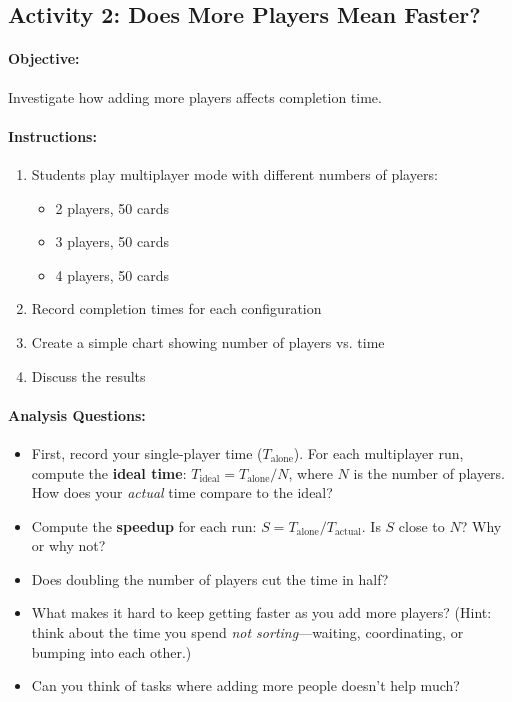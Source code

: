 \subsection{Activity 2: Does More Players Mean Faster?}

\paragraph{Objective:} Investigate how adding more players affects completion time.

\paragraph{Instructions:}
\begin{enumerate}
    \item Students play multiplayer mode with different numbers of players:
          \begin{itemize}
              \item 2 players, 50 cards
              \item 3 players, 50 cards
              \item 4 players, 50 cards
          \end{itemize}
    \item Record completion times for each configuration
    \item Create a simple chart showing number of players vs. time
    \item Discuss the results
\end{enumerate}

\paragraph{Analysis Questions:}
\begin{itemize}
    \item First, record your single-player time ($T_{\text{alone}}$). For each multiplayer run, compute the \textbf{ideal time}: $T_{\text{ideal}} = T_{\text{alone}} / N$, where $N$ is the number of players. How does your \emph{actual} time compare to the ideal?
    \item Compute the \textbf{speedup} for each run: $S = T_{\text{alone}} / T_{\text{actual}}$. Is $S$ close to $N$? Why or why not?
    \item Does doubling the number of players cut the time in half?
    \item What makes it hard to keep getting faster as you add more players? (Hint: think about the time you spend \emph{not sorting}---waiting, coordinating, or bumping into each other.)
    \item Can you think of tasks where adding more people doesn't help much?
\end{itemize}

